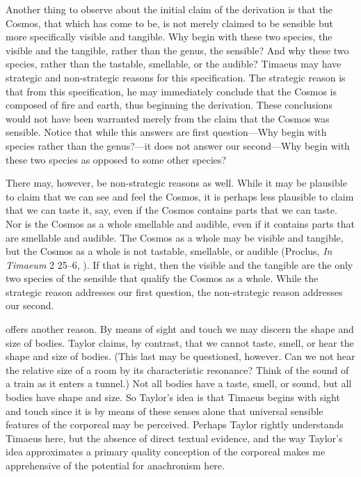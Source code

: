 
Another thing to observe about the initial claim of the derivation is that the Cosmos, that which has come to be, is not merely claimed to be sensible but more specifically visible and tangible. Why begin with these two species, the visible and the tangible, rather than the genus, the sensible? And why these two species, rather than the tastable, smellable, or the audible?  Timaeus may have strategic and non-strategic reasons for this specification. The strategic reason is that from this specification, he may immediately conclude that the Cosmos is composed of fire and earth, thus beginning the derivation. These conclusions would not have been warranted merely from the claim that the Cosmos was sensible. Notice that while this answers are first question---Why begin with species rather than the genus?---it does not answer our second---Why begin with these two species as opposed to some other species? 

There may, however, be non-strategic reasons as well. While it may be plausible to claim that we can see and feel the Cosmos, it is perhaps less plausible to claim that we can taste it, say, even if the Cosmos contains parts that we can taste. Nor is the Cosmos as a whole smellable and audible, even if it contains parts that are smellable and audible. The Cosmos as a whole may be visible and tangible, but the Cosmos as a whole is not tastable, smellable, or audible (Proclus, \emph{In Timaeum} 2 25--6, \citealt{Diehl:1903re}). If that is right, then the visible and the tangible are the only two species of the sensible that qualify the Cosmos as a whole. While the strategic reason addresses our first question, the non-strategic reason addresses our second. 

\citet[93]{Taylor:1928qb} offers another reason. By means of sight and touch we may discern the shape and size of bodies. Taylor claims, by contrast, that we cannot taste, smell, or hear the shape and size of bodies. (This last may be questioned, however. Can we not hear the relative size of a room by its characteristic resonance? Think of the sound of a train as it enters a tunnel.) Not all bodies have a taste, smell, or sound, but all bodies have shape and size. So Taylor's idea is that Timaeus begins with sight and touch since it is by means of these senses alone that universal sensible features of the corporeal may be perceived. Perhaps Taylor rightly understands Timaeus here, but the absence of direct textual evidence, and the way Taylor's idea approximates a primary quality conception of the corporeal makes me apprehensive of the potential for anachronism here.

